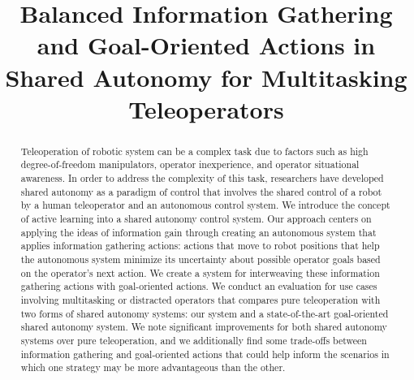 \documentclass[conference]{IEEEtran}
\begin{document}
\title{Balanced Information Gathering and Goal-Oriented Actions in Shared Autonomy for Multitasking Teleoperators\\
}

\author{
\and
{}
}

\maketitle

\begin{abstract}
Teleoperation of robotic system can be a complex task due to factors such as high degree-of-freedom manipulators, operator inexperience, and operator situational awareness. In order to address the complexity of this task, researchers have developed shared autonomy as a paradigm of control that involves the shared control of a robot by a human teleoperator and an autonomous control system. We introduce the concept of active learning into a shared autonomy control system. Our approach centers on applying the ideas of information gain through creating an autonomous system that applies information gathering actions: actions that move to robot positions that help the autonomous system minimize its uncertainty about possible operator goals based on the operator's next action. We create a system for interweaving these information gathering actions with goal-oriented actions. We conduct an evaluation for use cases involving multitasking or distracted operators that compares pure teleoperation with two forms of shared autonomy systems: our system and a state-of-the-art goal-oriented shared autonomy system. We note significant improvements for both shared autonomy systems over pure teleoperation, and we additionally find some trade-offs between information gathering and goal-oriented actions that could help inform the scenarios in which one strategy may be more advantageous than the other.
\end{abstract}
\end{document}
